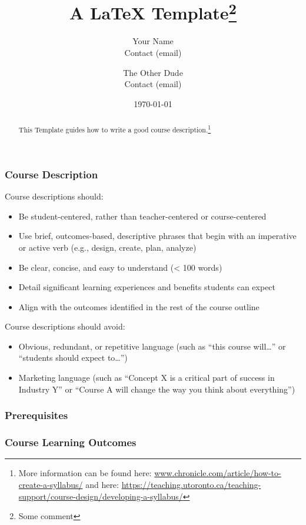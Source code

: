 \documentclass{article}
\title{A \LaTeX{} Template\thanks{Some comment}}
\author{Your Name  \\
	Contact (email) \\
	\and 
	The Other Dude \\
	Contact (email) \\
}
\date{\today}
\begin{document}
	\maketitle
	
\begin{abstract}
	This Template guides how to write a good course description.\footnote{More information can be found here: \url{www.chronicle.com/article/how-to-create-a-syllabus/} and here: \url{https://teaching.utoronto.ca/teaching-support/course-design/developing-a-syllabus/}}
\end{abstract}
	
\subsubsection*{Course Description}
	Course descriptions should:
\begin{itemize}
	\item Be student-centered, rather than teacher-centered or course-centered
	\item Use brief, outcomes-based, descriptive phrases that begin with an imperative or active verb (e.g., design, create, plan, analyze)
	\item Be clear, concise, and easy to understand (< 100 words)
	\item Detail significant learning experiences and benefits students can expect
	\item Align with the outcomes identified in the rest of the course outline
\end{itemize}	
	Course descriptions should avoid:
\begin{itemize}
	\item Obvious, redundant, or repetitive language (such as “this course will…” or “students should expect to…”)
	\item Marketing language (such as ``Concept X is a critical part of success in Industry Y'' or ``Course A will change the way you think about everything'')
\end{itemize}
	
\subsubsection*{Prerequisites}

\subsubsection*{Course Learning Outcomes}
\end{document}
